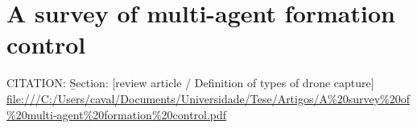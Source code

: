 \section{A survey of multi-agent formation control}\label{A survey of multi-agent formation control}
CITATION: \cite{OH2015424} \b{Section: [review article / Definition of types of drone capture]}\\
\url{file:///C:/Users/caval/Documents/Universidade/Tese/Artigos/A%20survey%20of%20multi-agent%20formation%20control.pdf}\\
